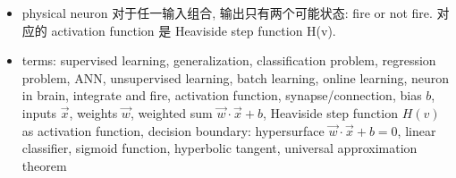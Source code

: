\begin{itemize}
\item
    physical neuron 对于任一输入组合, 输出只有两个可能状态: fire or not fire.
    对应的 activation function 是 Heaviside step function H(v).

\item
    terms: supervised learning, generalization, classification problem,
    regression problem, ANN, unsupervised learning, batch learning,
    online learning, neuron in brain, integrate and fire,
    activation function, synapse/connection, bias $b$, inputs $\vec{x}$,
    weights $\vec{w}$, weighted sum $\vec{w}\cdot\vec{x}+b$,
    Heaviside step function $H(v)$ as activation function,
    decision boundary: hypersurface $\vec{w}\cdot\vec{x}+b = 0$,
    linear classifier, sigmoid function, hyperbolic tangent,
    universal approximation theorem
\end{itemize}
